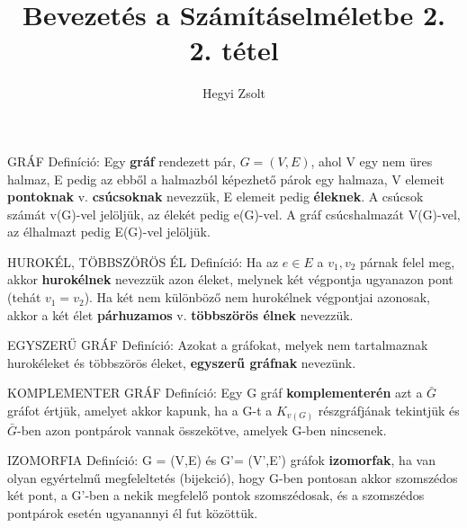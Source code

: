 \documentclass[]{article}
\title{Bevezetés a Számításelméletbe 2.\\{\large 2. tétel}}
\author{Hegyi Zsolt}
\begin{document}
\maketitle{}
\begin{shaded}
GRÁF Definíció: Egy \textbf{gráf} rendezett pár, $G = (V,E)$, ahol V egy nem üres halmaz, E pedig az ebből a halmazból képezhető párok egy halmaza, V elemeit \textbf{pontoknak} v. \textbf{csúcsoknak} nevezzük, E elemeit pedig \textbf{éleknek}. A csúcsok számát v(G)-vel jelöljük, az élekét pedig e(G)-vel. A gráf csúcshalmazát V(G)-vel, az élhalmazt pedig E(G)-vel jelöljük.
\end{shaded}
\begin{shaded}
HUROKÉL, TÖBBSZÖRÖS ÉL Definíció: Ha az $e \in E$ a {$v_1, v_2$} párnak felel meg, akkor \textbf{hurokélnek} nevezzük azon éleket, melynek két végpontja ugyanazon pont (tehát $v_1 = v_2$). Ha két nem különböző nem hurokélnek végpontjai azonosak, akkor a két élet \textbf{párhuzamos} v. \textbf{többszörös élnek} nevezzük.
\end{shaded}
\begin{shaded}
EGYSZERŰ GRÁF Definíció: Azokat a gráfokat, melyek nem tartalmaznak hurokéleket és többszörös éleket, \textbf{egyszerű gráfnak} nevezünk.
\end{shaded}
\begin{shaded}
KOMPLEMENTER GRÁF Definíció: Egy G gráf \textbf{komplementerén} azt a $\bar{G}$ gráfot értjük, amelyet akkor kapunk, ha a G-t a $K_{v(G)}$ részgráfjának tekintjük és $\bar{G}$-ben azon pontpárok vannak összekötve, amelyek G-ben nincsenek.
\end{shaded}
\begin{shaded}
IZOMORFIA Definíció: G = (V,E) és G'= (V',E') gráfok \textbf{izomorfak}, ha van olyan egyértelmű megfeleltetés (bijekció), hogy G-ben pontosan akkor szomszédos két pont, a G'-ben a nekik megfelelő pontok szomszédosak, és a szomszédos pontpárok esetén ugyanannyi él fut közöttük.
\end{shaded}
\end{document}
